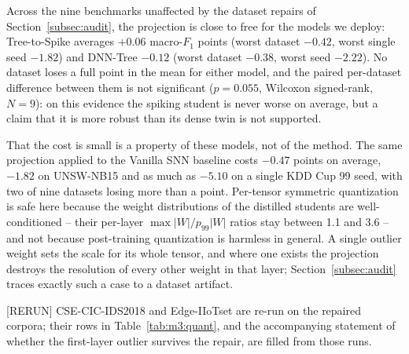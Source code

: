 Across the nine benchmarks unaffected by the dataset repairs of
Section~\ref{subsec:audit}, the projection is close to free for the models we
deploy: Tree-to-Spike averages $+0.06$ macro-$F_1$ points (worst dataset
$-0.42$, worst single seed $-1.82$) and DNN-Tree $-0.12$ (worst dataset $-0.38$,
worst seed $-2.22$). No dataset loses a full point in the mean for either model,
and the paired per-dataset difference between them is not significant
($p = 0.055$, Wilcoxon signed-rank, $N = 9$): on this evidence the spiking
student is never worse on average, but a claim that it is more robust than its
dense twin is not supported.

That the cost is small is a property of these models, not of the method. The same
projection applied to the Vanilla SNN baseline costs $-0.47$ points on average,
$-1.82$ on UNSW-NB15 and as much as $-5.10$ on a single KDD Cup 99 seed, with two
of nine datasets losing more than a point. Per-tensor symmetric quantization is
safe here because the weight distributions of the distilled students are
well-conditioned -- their per-layer $\max|W| / p_{99}|W|$ ratios stay between 1.1
and 3.6 -- and not because post-training quantization is harmless in general. A
single outlier weight sets the scale for its whole tensor, and where one exists
the projection destroys the resolution of every other weight in that layer;
Section~\ref{subsec:audit} traces exactly such a case to a dataset artifact.

[RERUN] CSE-CIC-IDS2018 and Edge-IIoTset are re-run on the repaired corpora; their
rows in Table~\ref{tab:m3:quant}, and the accompanying statement of whether the
first-layer outlier survives the repair, are filled from those runs.
